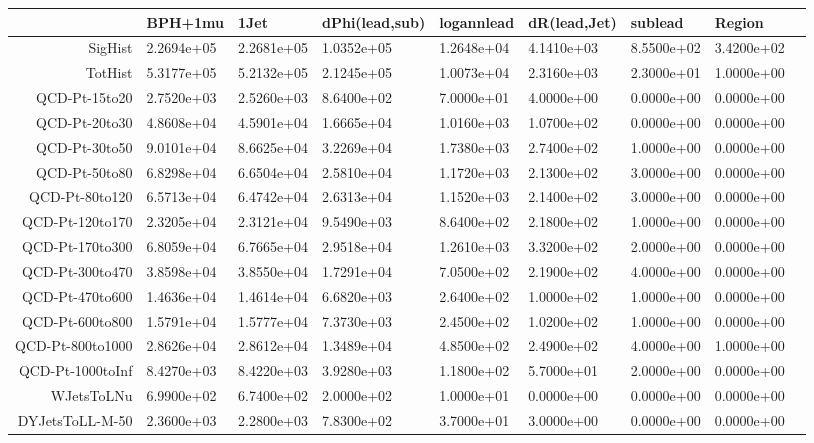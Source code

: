 \documentclass{article}
\begin{document}
\begin{adjustbox}{angle=90}

\begin{tabular}{rllllllll}

 \hline 
&BPH+1mu & 1Jet & dPhi(lead,sub) & logannlead & dR(lead,Jet) & sublead & Region \\
 \hline 
 \hline 
SigHist&2.2694e+05&2.2681e+05&1.0352e+05&1.2648e+04&4.1410e+03&8.5500e+02&3.4200e+02\\
 \hline 
TotHist&5.3177e+05&5.2132e+05&2.1245e+05&1.0073e+04&2.3160e+03&2.3000e+01&1.0000e+00\\
 \hline 
QCD-Pt-15to20&2.7520e+03&2.5260e+03&8.6400e+02&7.0000e+01&4.0000e+00&0.0000e+00&0.0000e+00\\
 \hline 
QCD-Pt-20to30&4.8608e+04&4.5901e+04&1.6665e+04&1.0160e+03&1.0700e+02&0.0000e+00&0.0000e+00\\
 \hline 
QCD-Pt-30to50&9.0101e+04&8.6625e+04&3.2269e+04&1.7380e+03&2.7400e+02&1.0000e+00&0.0000e+00\\
 \hline 
QCD-Pt-50to80&6.8298e+04&6.6504e+04&2.5810e+04&1.1720e+03&2.1300e+02&3.0000e+00&0.0000e+00\\
 \hline 
QCD-Pt-80to120&6.5713e+04&6.4742e+04&2.6313e+04&1.1520e+03&2.1400e+02&3.0000e+00&0.0000e+00\\
 \hline 
QCD-Pt-120to170&2.3205e+04&2.3121e+04&9.5490e+03&8.6400e+02&2.1800e+02&1.0000e+00&0.0000e+00\\
 \hline 
QCD-Pt-170to300&6.8059e+04&6.7665e+04&2.9518e+04&1.2610e+03&3.3200e+02&2.0000e+00&0.0000e+00\\
 \hline 
QCD-Pt-300to470&3.8598e+04&3.8550e+04&1.7291e+04&7.0500e+02&2.1900e+02&4.0000e+00&0.0000e+00\\
 \hline 
QCD-Pt-470to600&1.4636e+04&1.4614e+04&6.6820e+03&2.6400e+02&1.0000e+02&1.0000e+00&0.0000e+00\\
 \hline 
QCD-Pt-600to800&1.5791e+04&1.5777e+04&7.3730e+03&2.4500e+02&1.0200e+02&1.0000e+00&0.0000e+00\\
 \hline 
QCD-Pt-800to1000&2.8626e+04&2.8612e+04&1.3489e+04&4.8500e+02&2.4900e+02&4.0000e+00&1.0000e+00\\
 \hline 
QCD-Pt-1000toInf&8.4270e+03&8.4220e+03&3.9280e+03&1.1800e+02&5.7000e+01&2.0000e+00&0.0000e+00\\
 \hline 
WJetsToLNu&6.9900e+02&6.7400e+02&2.0000e+02&1.0000e+01&0.0000e+00&0.0000e+00&0.0000e+00\\
 \hline 
DYJetsToLL-M-50&2.3600e+03&2.2800e+03&7.8300e+02&3.7000e+01&3.0000e+00&0.0000e+00&0.0000e+00\\

\end{tabular}
\end{adjustbox}
\end{document}
